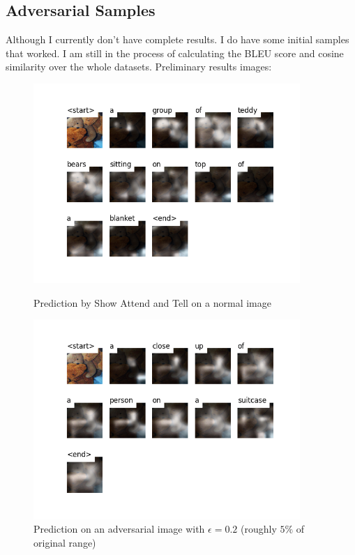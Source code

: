 \subsection*{Adversarial Samples}




Although I currently don't have complete results. I do have some initial samples that worked. I am still in the process of calculating the BLEU score and cosine similarity over the whole datasets.
Preliminary results images:

\begin{figure}
    \centering
    \begin{minipage}{0.45\textwidth}
        \centering
        \includegraphics[width=0.9\textwidth]{figures/caption_teddy_normal.png} %
        \caption{Prediction by Show Attend and Tell on a normal image}
    \end{minipage}\hfill
    \begin{minipage}{0.45\textwidth}
        \centering
        \includegraphics[width=0.9\textwidth]{figures/caption_teddy_adversarial_0.2.png} %
        \caption{Prediction on an adversarial image with $\epsilon=0.2$ (roughly $5\%$ of original range)}
    \end{minipage}
\end{figure}

